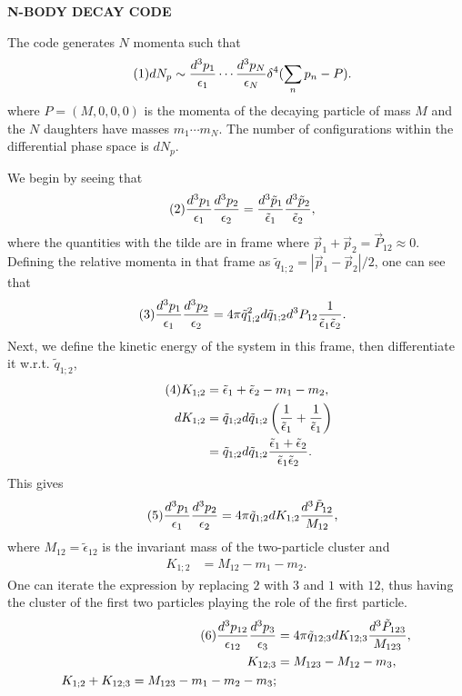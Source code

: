 \documentclass[11pt]{article}
\newcommand\eqnumber{\addtocounter{equation}{1}\tag{\theequation}}
\begin{document}
\centerline{\large\bf  N-BODY DECAY CODE}

The code generates $N$ momenta such that
\begin{align*}\eqnumber
dN_p&\sim \frac{d^3p_1}{\epsilon_1}\cdots\frac{d^3p_N}{\epsilon_N}\delta^4(\sum_np_n-P).
\end{align*}
where $P=(M,0,0,0)$ is the momenta of the decaying particle of mass $M$ and the $N$ daughters have masses $m_1\cdots m_N$. The number of configurations within the differential phase space is $dN_p$.

We begin by seeing that 
\begin{align*}\eqnumber
\frac{d^3p_1}{\epsilon_1}\frac{d^3p_2}{\epsilon_2}&=
\frac{d^3\tilde{p}_1}{\tilde{\epsilon}_1}\frac{d^3\tilde{p}_2}{\tilde{\epsilon}_2},
\end{align*}
where the quantities with the tilde are in frame where $\vec{p}_1+\vec{p}_2=\vec{P}_{12}\approx 0$. Defining the relative momenta in that frame as $\tilde{q}_{1;2}=|\vec{p}_1-\vec{p}_2|/2$, one can see that
\begin{align*}\eqnumber
\frac{d^3p_1}{\epsilon_1}\frac{d^3p_2}{\epsilon_2}&=
4\pi \tilde{q}_{1;2}^2d\tilde{q}_{1;2}d^3P_{12}\frac{1}{\tilde{\epsilon}_1\tilde{\epsilon}_2}.
\end{align*}
Next, we define the kinetic energy of the system in this frame, then differentiate it w.r.t. $\tilde{q}_{1;2}$,
\begin{align*}\eqnumber
K_{1;2}&=\tilde{\epsilon}_1+\tilde{\epsilon}_2-m_1-m_2,\\
dK_{1;2}&=\tilde{q}_{1;2}d\tilde{q}_{1;2}\left(\frac{1}{\tilde{\epsilon}_1}+\frac{1}{\tilde{\epsilon}_1}\right)\\
&=\tilde{q}_{1;2}d\tilde{q}_{1;2}\frac{\tilde{\epsilon}_1+\tilde{\epsilon}_2}{\tilde{\epsilon}_1\tilde{\epsilon}_2}.
\end{align*}
This gives
\begin{align*}\eqnumber
\frac{d^3p_1}{\epsilon_1}\frac{d^3p_2}{\epsilon_2}&=
4\pi\tilde{q}_{1;2}dK_{1;2}\frac{d^3\tilde{P}_{12}}{M_{12}},
\end{align*}
where $M_{12}=\tilde{\epsilon}_{12}$ is the invariant mass of the two-particle cluster and 
\begin{eqnarray}
K_{1;2}&=M_{12}-m_1-m_2.
\end{eqnarray}
One can iterate the expression by replacing $2$ with $3$ and $1$ with $12$, thus having the cluster of the first two particles playing the role of the first particle.
\begin{align*}\eqnumber
\frac{d^3p_{12}}{\epsilon_{12}}\frac{d^3p_3}{\epsilon_3}&=
4\pi\tilde{q}_{12;3}dK_{12;3}\frac{d^3\tilde{P}_{123}}{M_{123}},\\
K_{12;3}&=M_{123}-M_{12}-m_3,\\
K_{1;2}+K_{12;3}=M_{123}-m_1-m_2-m_3;
\end{align*}
\end{document}
